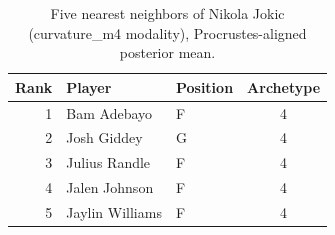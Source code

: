\begin{table}[htbp]
  \centering\small
  \begin{tabular}{rllc}
    \toprule
    Rank & Player & Position & Archetype \\
    \midrule
    1 & Bam Adebayo & F & 4 \\
    2 & Josh Giddey & G & 4 \\
    3 & Julius Randle & F & 4 \\
    4 & Jalen Johnson & F & 4 \\
    5 & Jaylin Williams & F & 4 \\
    \bottomrule
  \end{tabular}
  \caption{Five nearest neighbors of Nikola Jokic (curvature_m4 modality), Procrustes-aligned posterior mean.}
  \label{tab:Nikola_Jokic_neighbors_curvature_m4}
\end{table}

